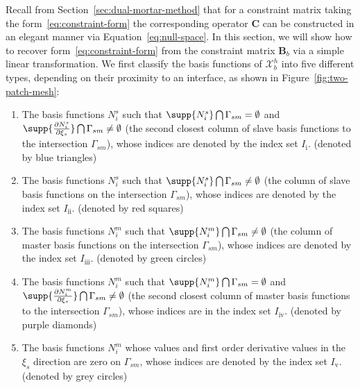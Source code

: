 Recall from Section~\ref{sec:dual-mortar-method} that for a constraint matrix taking the form~\eqref{eq:constraint-form} the corresponding operator $\mathbf{C}$ can be constructed in an elegant manner via Equation~\eqref{eq:null-space}. In this section, we will show how to recover form~\eqref{eq:constraint-form} from the constraint matrix $\mathbf{B}_b$ via a simple linear transformation. We first classify the basis functions of $\mathcal{X}_b^h$ into five different types, depending on their proximity to an interface, as shown in Figure~\ref{fig:two-patch-mesh}:
\begin{enumerate}
  \item The basis functions $N^s_i$ such that $\supp{N^s_i}\bigcap\Gamma_{sm}=\emptyset$ and $\supp{\frac{\partial{}N^s_i}{\partial{\xi_s}}}\bigcap\Gamma_{sm}\neq\emptyset$ (the second closest column of slave basis functions to the intersection $\Gamma_{sm}$), whose indices are denoted by the index set $I_\text{i}$. (denoted by blue triangles)
  \item The basis functions $N^s_i$ such that $\supp{N^s_i}\bigcap\Gamma_{sm}\neq\emptyset$ (the column of slave basis functions on the intersection $\Gamma_{sm}$), whose indices are denoted by the index set $I_\text{ii}$. (denoted by red squares)
  \item The basis functions $N^m_i$ such that $\supp{N^m_i}\bigcap\Gamma_{sm}\neq\emptyset$  (the column of master basis functions on the intersection $\Gamma_{sm}$), whose indices are denoted by the index set $I_\text{iii}$. (denoted by green circles)
  \item The basis functions $N^m_i$ such that $\supp{N^m_i}\bigcap\Gamma_{sm}=\emptyset$ and $\supp{\frac{\partial{}N^m_i}{\partial{\xi_s}}}\bigcap\Gamma_{sm}\neq\emptyset$  (the second closest column of master basis functions to the intersection $\Gamma_{sm}$), whose indices are in the index set $I_\text{iv}$. (denoted by purple diamonds)
  \item The basis functions $N^m_i$ whose values and first order derivative values in the $\xi_s$ direction are zero on $\Gamma_{sm}$, whose indices are denoted by the index set $I_\text{v}$. (denoted by grey circles)
\end{enumerate}\par

